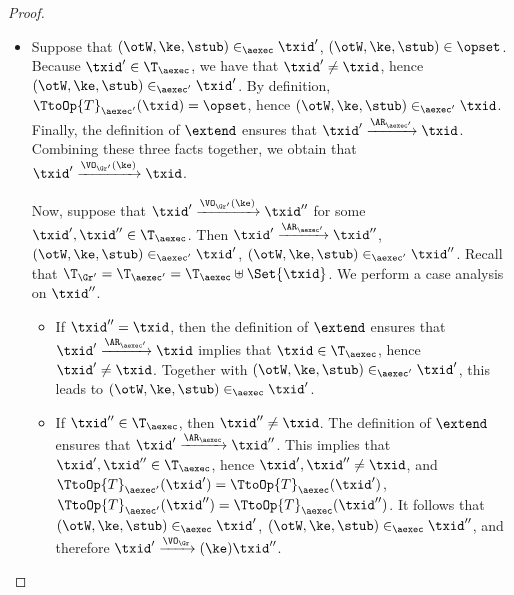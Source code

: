 \begin{proof}
\begin{enumerate}
\begin{itemize}
\item Suppose that $(\otW, \ke, \stub) \in_{\aexec} \txid'$, $(\otW, \ke, \stub) \in \opset$. Because $\txid' \in \T_{\aexec}$, 
we have that $\txid' \neq \txid$, hence $(\otW, \ke, \stub) \in_{\aexec' }\txid'$. By definition, 
$\TtoOp{T}_{\aexec'}(\txid) = \opset$, hence $(\otW, \ke, \stub) \in_{\aexec'} \txid$. Finally, 
the definition of $\extend$ ensures that $\txid' \xrightarrow{\AR_{\aexec'}} \txid$. Combining 
these three facts together, we obtain that  
$\txid' \xrightarrow{\VO_{\Gr'}(\ke)} \txid$. 

Now, suppose that $\txid' \xrightarrow{\VO_{\Gr'}(\ke)} \txid''$ for some $\txid', \txid'' \in \T_{\aexec}$. 
Then $\txid' \xrightarrow{\AR_{\aexec'}} \txid''$, $(\otW, \ke, \stub) \in_{\aexec'} \txid'$, $(\otW, \ke, \stub) 
\in_{\aexec'} \txid''$. 
Recall that $\T_{\Gr'} = \T_{\aexec'} = \T_{\aexec} \uplus \Set{ \txid }$. We perform a case analysis on $\txid''$. 

\begin{itemize}

\item If $\txid'' = \txid$, then the definition of $\extend$ ensures that $\txid' \xrightarrow{\AR_{\aexec'}} \txid$ 
implies that $\txid \in \T_{\aexec}$, hence $\txid' \neq \txid$. 
Together with $(\otW, \ke, \stub) \in_{\aexec'} 
\txid'$, this leads to $(\otW, \ke, \stub) \in_{\aexec} \txid'$. 

\item If $\txid'' \in \T_{\aexec}$, then $\txid'' \neq \txid$. The definition of $\extend$ ensures that $\txid' \xrightarrow{\AR_{\aexec}} \txid''$. 
This implies that $\txid', \txid'' \in \T_{\aexec}$, hence $\txid', \txid'' \neq \txid$, and $\TtoOp{T}_{\aexec'}(\txid') = \TtoOp{T}_{\aexec}(\txid')$, 
$\TtoOp{T}_{\aexec'}(\txid'') = \TtoOp{T}_{\aexec}(\txid'')$. It follows that $(\otW, \ke, \stub) \in_{\aexec} \txid'$, 
$(\otW, \ke, \stub) \in_{\aexec} \txid''$, and therefore $\txid' \xrightarrow{\VO_{\Gr}}(\ke) \txid''$.

\end{itemize}
\end{itemize}
\end{enumerate}
\end{proof}


